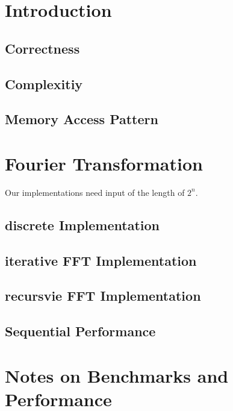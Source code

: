 \documentclass[12pt,a4paper,titlepage,oneside]{scrartcl}
\begin{document}
\maketitle
\setcounter{section}{0}
\setcounter{tocdepth}{2}
\tableofcontents
\pagebreak
%
%
\section{Introduction}
	\subsection{Correctness}
	
	\subsection{Complexitiy}
	
	\pagebreak
	\subsection{Memory Access Pattern}
	
\section{Fourier Transformation}
	Our implementations need input of the length of \(2^{n}\).
	\subsection{discrete Implementation}
	
	\subsection{iterative FFT Implementation}
	
	\subsection{recursvie FFT Implementation}
	
	\subsection{Sequential Performance}	
	

\section{Notes on Benchmarks and Performance}
\end{document}
